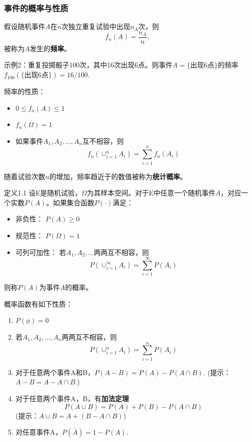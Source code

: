\documentclass{beamer}
\begin{document}
	\begin{frame}
		\frametitle{事件的概率与性质}
		假设随机事件$A$在$n$次独立重复试验中出现$n_A$次，则
		\[
		f_n(A) = \frac{n_A}{n},
		\]
		被称为$A$发生的\textbf{频率}。
		
		示例2：重复投掷骰子100次，其中16次出现6点。则事件$A = \{\text{出现6点}\}$的频率$f_{100}(\{\text{出现6点}\}) = 16 / 100$.
		
		频率的性质：
		\begin{itemize}
			\item $0 \leq f_n(A) \leq 1$
			\item $f_n(\Omega) = 1$
			\item 如果事件$A_1, A_2, \dots, A_n$互不相容，则
			\[
			f_n(\cup_{i = 1}^{n}A_i) = \sum_{i = 1}^{n}f_n(A_i)
			\]
		\end{itemize}
		随着试验次数$n$的增加，频率趋近于的数值被称为\textbf{统计概率}。
	\end{frame}
	
	\begin{frame}
		定义1.1 设E是随机试验，$\Omega$为其样本空间。对于E中任意一个随机事件$A$，对应一个实数$P(A)$。如果集合函数$P(\cdot)$满足：
		\begin{itemize}
			\item 非负性： $P(A) \geq 0$
			\item 规范性： $P(\Omega) = 1$
			\item 可列可加性： 若$A_1, A_2, \dots$两两互不相容，则
			\[
			P(\cup_{i = 1}^{\infty}A_i) = \sum_{i = 1}^{\infty}P(A_i)
			\]
		\end{itemize}
		则称$P(A)$为事件$A$的概率。
		
		概率函数有如下性质：
		\begin{enumerate}
			\item $P(\phi) = 0$
			\item 若$A_1, A_2, \dots, A_n$两两互不相容，则
			\[
			P(\cup_{i = 1}^{n}A_i) = \sum_{i = 1}^{n}P(A_i)
			\]
		\end{enumerate}
	\end{frame}
	
	\begin{frame}
		\begin{enumerate}
			\setcounter{enumi}{2}
			\item 对于任意两个事件A和B，$P(A - B) = P(A) - P(A \cap B)$. (提示：$A - B = A - A \cap B$.)
			\item 对于任意两个事件A，B，有\textbf{加法定理}
			\[
			P(A \cup B) = P(A) + P(B) - P(A \cap B)
			\]
			(提示：$A \cup B = A + (B - A \cap B)$)
			\item 对任意事件A，$P(\bar{A}) = 1 - P(A)$. 
		\end{enumerate}
	\end{frame}
	
\end{document}
